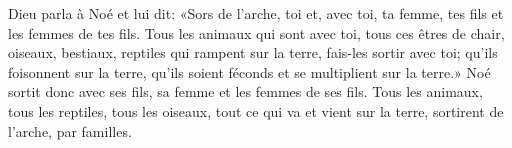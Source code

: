 Dieu parla à Noé et lui dit:
	«Sors de l’arche, toi et, avec toi, ta femme,
	tes fils et les femmes de tes fils.
Tous les animaux qui sont avec toi, tous ces êtres de chair,
	oiseaux, bestiaux, reptiles qui rampent sur la terre,
	fais-les sortir avec toi;
	qu’ils foisonnent sur la terre,
	qu’ils soient féconds et se multiplient sur la terre.»
Noé sortit donc avec ses fils, sa femme et les femmes de ses fils.
Tous les animaux, tous les reptiles, tous les oiseaux,
	tout ce qui va et vient sur la terre,
	sortirent de l’arche, par familles.
